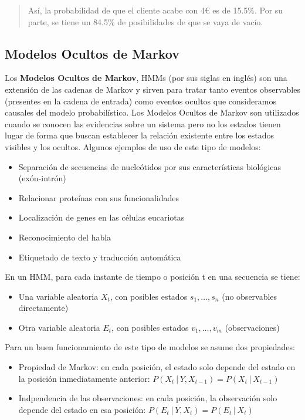 \documentclass[
  a4paper,
  DIV=11,
  numbers=noendperiod]{scrreprt}
\providecommand{\tightlist}{%
  \setlength{\itemsep}{0pt}\setlength{\parskip}{0pt}}\usepackage{longtable,booktabs,array}
\begin{document}
\begin{quote}
Así, la probabilidad de que el cliente acabe con 4€ es de 15.5\%. Por su
parte, se tiene un 84.5\% de posibilidades de que se vaya de vacío.
\end{quote}

\subsection{Modelos Ocultos de
Markov}\label{modelos-ocultos-de-markov-1}

Los \textbf{Modelos Ocultos de Markov}, HMMs (por sus siglas en inglés)
son una extensión de las cadenas de Markov y sirven para tratar tanto
eventos observables (presentes en la cadena de entrada) como eventos
ocultos que consideramos causales del modelo probabilístico. Los Modelos
Ocultos de Markov son utilizados cuando se conocen las evidencias sobre
un sistema pero no los estados tienen lugar de forma que buscan
establecer la relación existente entre los estados visibles y los
ocultos. Algunos ejemplos de uso de este tipo de modelos:

\begin{itemize}
\tightlist
\item
  Separación de secuencias de nucleótidos por sus características
  biológicas (exón-intrón)
\item
  Relacionar proteínas con sus funcionalidades
\item
  Localización de genes en las células eucariotas
\item
  Reconocimiento del habla
\item
  Etiquetado de texto y traducción automática
\end{itemize}

En un HMM, para cada instante de tiempo o posición t en una secuencia se
tiene:

\begin{itemize}
\tightlist
\item
  Una variable aleatoria \(X_t\), con posibles estados \(s_1, … ,s_n\)
  (no observables directamente)
\item
  Otra variable aleatoria \(E_t\), con posibles estados \(v_1, … ,v_m\)
  (observaciones)
\end{itemize}

Para un buen funcionamiento de este tipo de modelos se asume dos
propiedades:

\begin{itemize}
\tightlist
\item
  Propiedad de Markov: en cada posición, el estado solo depende del
  estado en la posición inmediatamente anterior:
  \(P(X_t│Y, X_{t-1}) = P(X_t│X_{t-1})\)
\item
  Indpendencia de las observaciones: en cada posición, la observación
  solo depende del estado en esa posición: \(P(E_t│Y, X_t )=P(E_t│X_t)\)
\end{itemize}
\end{document}
